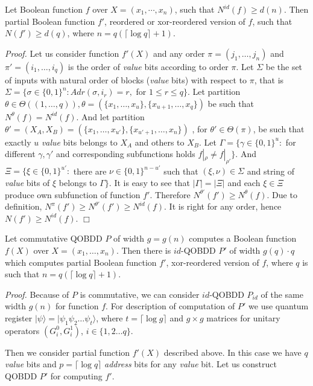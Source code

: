 \documentclass{llncs}
\newcommand{\Beginproof}{{\em Proof.}  }
\newcommand{\Endproof}{\hfill$\Box$\\}
\newcommand{\ket}[1]{|#1\rangle}
\begin{document}
\begin{theorem} \label{th:d-obdd}
Let Boolean function $f$ over $X=(x_1, \cdots, x_n)$, such that $N^{id}(f)\geq d(n)$. Then partial Boolean function $f'$, reordered or xor-reordered version of $f$, such that $N(f')\geq d(q)$, where  $n=q(\lceil\log q\rceil+1)$.
\end{theorem}
\Beginproof
Let us consider function $f'(X)$ and any order $\pi=(j_1,\dots,j_n)$ and $\pi'=(i_1,\dots,i_q)$ is the order of {\em value} bits according to order $\pi$. Let $\Sigma$ be the set of inputs with natural order of blocks ({\em value} bits) with respect to $\pi$, that is $\Sigma=\{\sigma\in\{0,1\}^n: Adr(\sigma,i_r)=r,$ for $1\leq r \leq q\}$. 
%
Let partition $\theta\in \Theta((1,\dots,q)), \theta=(\{x_1,\dots,x_u\}, \{x_{u+1},\dots,x_q\})$ be such that $N^\theta(f)=N^{id}(f)$. And let partition $\theta'=(X_A,X_B)=(\{x_1,\dots,x_{u'}\}, \{x_{u'+1},\dots,x_n\})$ , for $\theta'\in \Theta(\pi)$, be such that exactly $u$ {\em value} bits belongs to $X_A$ and others to $X_B$.
%
Let $\Gamma=\{\gamma\in\{0,1\}^u:$ for different $\gamma,\gamma'$ and corresponding subfunctions holds $f|_\rho\neq f|_{\rho'}\}$. And $\Xi=\{\xi\in\{0,1\}^{u'}:$ there are $\nu\in\{0,1\}^{n-u'}$ such that $(\xi,\nu)\in \Sigma$ and string of {\em value} bits of $\xi$ belongs to $\Gamma\}$.
% 
It is easy to see that $|\Gamma|=|\Xi|$ and each $\xi\in\Xi$ produce own subfunction of function $f'$. Therefore $N^{\theta'}(f')\geq N^{\theta}(f)$.  Due to definition, $N^{\pi}(f')\geq N^{\theta'}(f')\geq N^{id}(f)$. It is right for any order, hence $N(f')\geq N^{id}(f)$.
\Endproof


\begin{theorem}\label{th:d-qobdd}
Let commutative QOBDD $P$ of width $g=g(n)$ computes a Boolean function $f(X)$ over  $X=(x_1, \ldots, x_n)$. Then there is $id$-QOBDD $P'$ of width $g(q) \cdot q$ which computes partial Boolean function $f'$, xor-reordered version of $f$, where $q$ is such that $n=q(\lceil\log q\rceil+1)$. 
\end{theorem}

\Beginproof
Because of $P$ is commutative, we can consider $id$-QOBDD $P_{id}$ of the same width $g(n)$ for function $f$.
For description of computation of $P'$ we use quantum register $\ket\psi = \ket {\psi_1 \psi_2 \ldots \psi_t}$, where $t=\lceil \log{g} \rceil$ and $g \times g$ matrices for unitary operators $(G_i^0, G_i^1)$, $i \in \{1,2 \ldots q\}$.

Then we consider partial function $f'(X)$ described above. In this case we have $q$ {\em value} bits and $p=\lceil \log{q} \rceil$ {\em address} bits for any {\em value} bit. Let us construct QOBDD $P'$ for computing $f'$.
%
\end{document}
